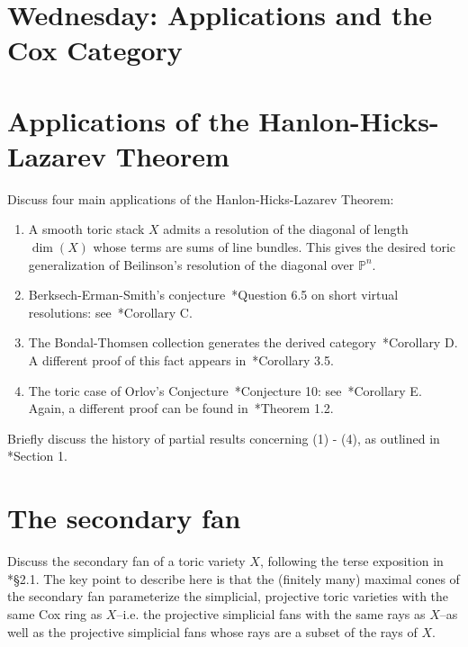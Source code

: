 \documentclass[11pt]{amsart}
\numberwithin{equation}{section}
\theoremstyle{definition}
\theoremstyle{remark}
\newcommand{\PP}{\mathbb P}
\begin{document}
\section*{Wednesday: Applications and the Cox Category}
\section{Applications of the Hanlon-Hicks-Lazarev Theorem}
Discuss four main applications of the Hanlon-Hicks-Lazarev Theorem:
\begin{enumerate}
\item A smooth toric stack $X$ admits a resolution of the diagonal of length $\dim(X)$ whose terms are sums of line bundles. This gives the desired toric generalization of Beilinson's resolution of the diagonal over $\PP^n$. 
\item Berksech-Erman-Smith's conjecture~\cite{BES}*{Question 6.5} on short virtual resolutions: see~\cite{HHL}*{Corollary C}.
\item The Bondal-Thomsen collection generates the derived category~\cite{HHL}*{Corollary D}.  A different proof of this fact appears in~\cite{FH}*{Corollary 3.5}.
\item The toric case of Orlov's Conjecture~\cite{orlov}*{Conjecture 10}: see~\cite{HHL}*{Corollary E}. Again, a different proof can be found in~\cite{FH}*{Theorem 1.2}.
\end{enumerate}

\noindent Briefly discuss the history of partial results concerning (1) - (4), as outlined in \cite{HHL}*{Section 1}. 



\section{The secondary fan}
Discuss the secondary fan of a toric variety $X$, following the terse exposition in \cite{king}*{\S 2.1}. The key point to describe here is that the (finitely many) maximal cones of the secondary fan parameterize the simplicial, projective toric varieties with the same Cox ring as $X$--i.e. the projective simplicial fans with the same rays as $X$--as well as the projective simplicial fans whose rays are a subset of the rays of $X$.
\end{document}
